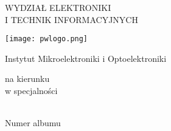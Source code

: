 \thispagestyle{empty}

{ \centering

{ %
\setmainfont{Latin Modern Mono}
\begin{minipage}[c]{\textwidth}
\centering
\begin{minipage}[c]{0.65\textwidth}   \centering
{\fontsize{23pt}{36pt}\selectfont {Politechnika Warszawska}} \vskip 4pt 
{\setmainfont[LetterSpace=35]{Latin Modern Mono} \fontsize{12pt}{24pt}   \selectfont  
 {WYDZIAŁ \hskip12pt ELEKTRONIKI \\  I \hskip12pt TECHNIK \hskip12pt INFORMACYJNYCH}}
\end{minipage}
\begin{minipage}[c]{0.18\textwidth}
\centering
\texttt{[image: pwlogo.png]}
\end{minipage}
\end{minipage}
}

\vfill

{\setmainfont{Noto Sans} 
\begin{minipage}[c]{\textwidth}   \centering
{\fontsize{12pt}{24pt}\selectfont Instytut Mikroelektroniki i Optoelektroniki}
\end{minipage}}

\vfill

{ %
\setmainfont{Latin Modern Mono}
\begin{minipage}[c][][c]{\textwidth}   \centering
{\fontsize{37pt}{120pt} \selectfont \rodzajpracy} 
\end{minipage}}

\vfill

{\setmainfont{Noto Sans}
\begin{minipage}[c]{\textwidth}   \centering
{\fontsize{12pt}{24pt}\selectfont na kierunku \kierunek}\\  \vskip 6pt 
{\fontsize{12pt}{24pt}\selectfont w specjalności \specjalnosc}
\end{minipage}}

\vfill

{\setmainfont{Noto Sans} 
\begin{minipage}[c]{\textwidth}   \centering
{\fontsize{14pt}{36pt}\selectfont \tytulpl}
\end{minipage}}

\vfill

	 
{\setmainfont{Noto Sans} 
\begin{minipage}[c]{\textwidth}   \centering
{\fontsize{20pt}{28pt}\selectfont \autor}\\ \vskip 6pt
{\fontsize{12pt}{24pt}\selectfont Numer albumu \nralbumu}
\end{minipage}}

}
